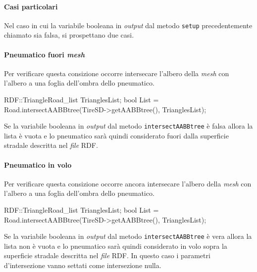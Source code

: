 \paragraph{Casi particolari}
Nel caso in cui la variabile booleana in \textit{output} dal metodo \texttt{setup} precedentemente chiamato sia falsa, si prospettano due casi.
%
\paragraph{Pneumatico fuori \textit{mesh}}
Per verificare questa consizione occorre intersecare l'albero della \textit{mesh} con l'albero a una foglia dell'ombra dello pneumatico.
\begin{pseudoc}
	RDF::TriangleRoad_list TrianglesList;
	bool List = Road.intersectAABBtree(TireSD->getAABBtree(), TrianglesList);
\end{pseudoc}
Se la variabile booleana in \textit{output} dal metodo \texttt{intersectAABBtree} è falsa allora la lista è vuota e lo pneumatico sarà quindi considerato fuori dalla superficie stradale descritta nel \textit{file} \ac{RDF}.
%
\paragraph{Pneumatico in volo}
Per verificare questa consizione occorre ancora intersecare l'albero della \textit{mesh} con l'albero a una foglia dell'ombra dello pneumatico.
\begin{pseudoc}
	RDF::TriangleRoad_list TrianglesList;
	bool List = Road.intersectAABBtree(TireSD->getAABBtree(), TrianglesList);
\end{pseudoc}
Se la variabile booleana in \textit{output} dal metodo \texttt{intersectAABBtree} è vera allora la lista non è vuota e lo pneumatico sarà quindi considerato in volo sopra la superficie stradale descritta nel \textit{file} \ac{RDF}. In questo caso i parametri d'intersezione vanno settati come intersezione nulla.
%
%
